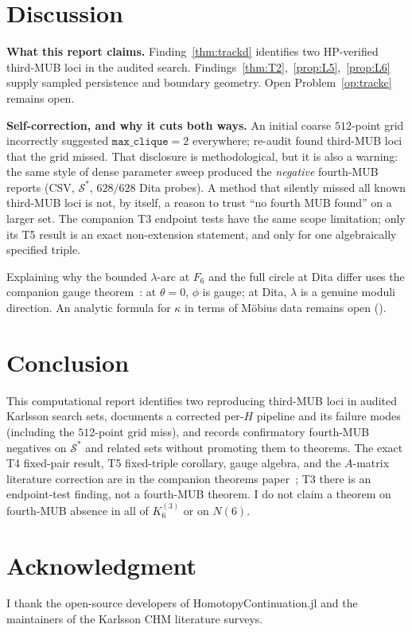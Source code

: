 \documentclass[onecolumn]{IEEEtran}
\begin{document}
\section{Discussion}
\label{sec:discussion}

\textbf{What this report claims.} Finding~\ref{thm:trackd} identifies two HP-verified third-MUB loci in the audited search. Findings~\ref{thm:T2},~\ref{prop:L5},~\ref{prop:L6} supply sampled persistence and boundary geometry. Open Problem~\ref{op:trackc} remains open.

\textbf{Self-correction, and why it cuts both ways.} An initial coarse $512$-point grid incorrectly suggested $\texttt{max\_clique}=2$ everywhere; re-audit found third-MUB loci that the grid missed.
That disclosure is methodological, but it is also a warning: the same style of dense parameter sweep produced the \emph{negative} fourth-MUB reports (CSV, $\mathcal{S}^*$, $628/628$ Dita probes). A method that silently missed all known third-MUB loci is not, by itself, a reason to trust ``no fourth MUB found'' on a larger set. The companion T3 endpoint tests have the same scope limitation; only its T5 result is an exact non-extension statement, and only for one algebraically specified triple.

Explaining why the bounded $\lambda$-arc at $F_6$ and the full circle at Dita differ uses the companion gauge theorem~\cite{JaupiTheorems2026}: at $\theta=0$, $\phi$ is gauge; at Dita, $\lambda$ is a genuine moduli direction. An analytic formula for $\kappa$ in terms of M\"obius data remains open ().

\section{Conclusion}
\label{sec:conclusion}

This computational report identifies two reproducing third-MUB loci in audited Karlsson search sets, documents a corrected per-$H$ pipeline and its failure modes (including the $512$-point grid miss), and records confirmatory fourth-MUB negatives on $\mathcal{S}^*$ and related sets without promoting them to theorems.
The exact T4 fixed-pair result, T5 fixed-triple corollary, gauge algebra, and the $A$-matrix literature correction are in the companion theorems paper~\cite{JaupiTheorems2026}; T3 there is an endpoint-test finding, not a fourth-MUB theorem.
I do not claim a theorem on fourth-MUB absence in all of $K_6^{(3)}$ or on $N(6)$.

\section*{Acknowledgment}
I thank the open-source developers of HomotopyContinuation.jl and the maintainers of the Karlsson CHM literature surveys.
\end{document}
